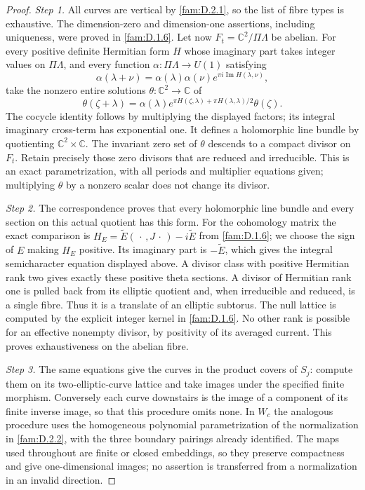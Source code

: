 \begin{proof}
\par\noindent\textit{Step 1.} All curves are vertical by \ref{fam:D.2.1}, so the list of fibre types is exhaustive.
The dimension-zero and dimension-one assertions, including uniqueness,
were proved in \ref{fam:D.1.6}. Let now $F_t=\mathbb C^2/\Pi\Lambda$ be abelian.
For every positive definite Hermitian form $H$ whose imaginary part takes
integer values on $\Pi\Lambda$, and every function
$\alpha:\Pi\Lambda\to U(1)$ satisfying
\[
 \alpha(\lambda+\nu)=\alpha(\lambda)\alpha(\nu)
                 e^{\pi i\operatorname{Im}H(\lambda,\nu)},
\]
take the nonzero entire solutions $\theta:\mathbb C^2\to\mathbb C$ of
\begin{equation}\label{fam:eq:cd-theta-sections}
 \theta(\zeta+\lambda)=\alpha(\lambda)
 e^{\pi H(\zeta,\lambda)+\pi H(\lambda,\lambda)/2}\theta(\zeta).
\end{equation}
The cocycle identity follows by multiplying the displayed factors; its
integral imaginary cross-term has exponential one. It defines a
holomorphic line bundle by quotienting $\mathbb C^2\times\mathbb C$.
The invariant zero set of $\theta$ descends to a compact divisor on
$F_t$. Retain precisely those zero divisors that are reduced and
irreducible. This is an exact parametrization, with all periods and
multiplier equations given; multiplying $\theta$ by a nonzero scalar
does not change its divisor.

\par\noindent\textit{Step 2.} The correspondence \cite[Theorem 4.1 and equation (4.3)]{Schnell19} proves
that every holomorphic line bundle and every section on this actual
quotient has this form. For the cohomology matrix the exact comparison is
$H_E=\widetilde E(\,\cdot\,,J\,\cdot\,)-i\widetilde E$ from \ref{fam:D.1.6};
we choose the sign of $E$ making $H_E$ positive. Its imaginary part is
$-\widetilde E$, which gives the integral semicharacter equation displayed
above. A divisor class with positive Hermitian rank two gives exactly
these positive theta sections. A divisor of Hermitian rank one is pulled
back from its elliptic quotient and, when irreducible and reduced, is a
single fibre. Thus it is a translate of an elliptic subtorus. The null
lattice is computed by the explicit integer kernel in \ref{fam:D.1.6}. No other
rank is possible for an effective nonempty divisor, by positivity of its
averaged current. This proves exhaustiveness on the abelian fibre.

\par\noindent\textit{Step 3.} The same equations give the curves in the product covers of $S_j$:
compute them on its two-elliptic-curve lattice and take images under the
specified finite morphism. Conversely each curve downstairs is the image
of a component of its finite inverse image, so that this procedure omits
none. In $W_c$ the analogous procedure uses the homogeneous polynomial
parametrization of the normalization in \ref{fam:D.2.2}, with the three boundary
pairings already identified. The maps used throughout are finite or
closed embeddings, so they preserve compactness and give one-dimensional
images; no assertion is transferred from a normalization in an invalid
direction.
\end{proof}

